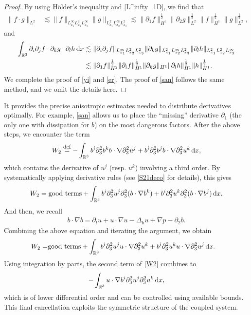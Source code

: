 \documentclass[11pt]{amsart}
\theoremstyle{definition}
\newcommand{\R}{\mathbb{R}}
\newcommand{\h}{\mathrm{h}}
\def\eqdefa{\buildrel\hbox{\footnotesize def}\over =}
\newcommand{\dx}{\,{\rm d}x}
\numberwithin{equation}{section}
\begin{document}
\begin{proof}
	By using H\"older's inequality and \eqref{L^infty_1D}, we find that
	\begin{align*}
		\|f\cdot g\|_{L^2}&\lesssim\|f\|_{L^\infty_{x_1}L^2_{x_2}L^\infty_{x_3}}\| g\|_{L^2_{x_1}L^\infty_{x_2}L^2_{x_3}}\lesssim\|\partial_1 f\|_{H^1}^\frac12\|\partial_2 g\|_{L^2}^\frac12\|f\|_{H^1}^\frac12\|g\|_{L^2}^\frac12,
	\end{align*}
	and
	\begin{align*}
		\int_{\R^3}\partial_i\partial_jf\cdot\partial_kg\cdot\partial_lh\dx&\lesssim\|\partial_i\partial_jf\|_{L^\infty_{x_1}L^2_{x_2}L^2_{x_3}}\|\partial_kg\|_{L^2_{x_1}L^\infty_{x_2}L^2_{x_3}}\|\partial_lh\|_{L^2_{x_1}L^2_{x_2}L^\infty_{x_3}}\\
		&\lesssim\|\partial_1f\|_{H^2}^\frac12\|\partial_if\|_{H^1}^\frac12\|\partial_kg\|_{H^1}\|\partial_lh\|_{H^1}^\frac12\|h\|_{H^1}^\frac12.
	\end{align*}
	We complete the proof of \eqref{yi} and \eqref{er}. The proof of \eqref{san} follows the same method, and we omit the details here.
\end{proof}
It provides the precise anisotropic estimates needed to distribute derivatives optimally. For example, \eqref{san} allows us to place the ``missing'' derivative $\partial_1$ (the only one with dissipation for $b$) on the most dangerous factors. After the above steps, we encounter the term
\begin{align*}
	W_2\eqdefa -\int_{\R^3} b^i\partial_3^2b^k b\cdot\nabla\partial_3^2u^j+b^i\partial_3^2b^jb\cdot\nabla\partial_3^2u^k\dx,
\end{align*}
which contains the derivative of $u^j$ (resp. $u^k$) involving a third order. By systematically applying derivative rules (see \eqref{S21deco} for details), this gives
\begin{align*}
	W_2=\text{good terms}+\int_{\R^3}b^i\partial_3^2u^j\partial_3^2(b\cdot\nabla b^k)+b^i\partial_3^2u^k\partial_3^2(b\cdot\nabla b^j)\dx.
\end{align*}
And then, we recall
\begin{align}\label{bbbb}
	b\cdot\nabla b=\partial_tu+u\cdot\nabla u-\Delta_\h u+\nabla p-\partial_2b.
\end{align}
Combining the above equation and iterating the argument, we obtain
\begin{align}\label{W2}
	W_2=&\text{good terms}+\int_{\mathbb{R}^3} b^i \partial_3^2 u^j u\cdot\nabla\partial_3^2 u^k  +  b^i \partial_3^2 u^k u\cdot\nabla\partial_3^2 u^j \dx.
\end{align}
Using integration by parts, the second term of \eqref{W2} combines to
\begin{align*}
	-\int_{\mathbb{R}^3} u\cdot\nabla b^i \partial_3^2 u^j \partial_3^2 u^k \dx,
\end{align*}
which is of lower differential order and can be controlled using available bounds. This final cancellation exploits the symmetric structure of the coupled system.
\end{document}
